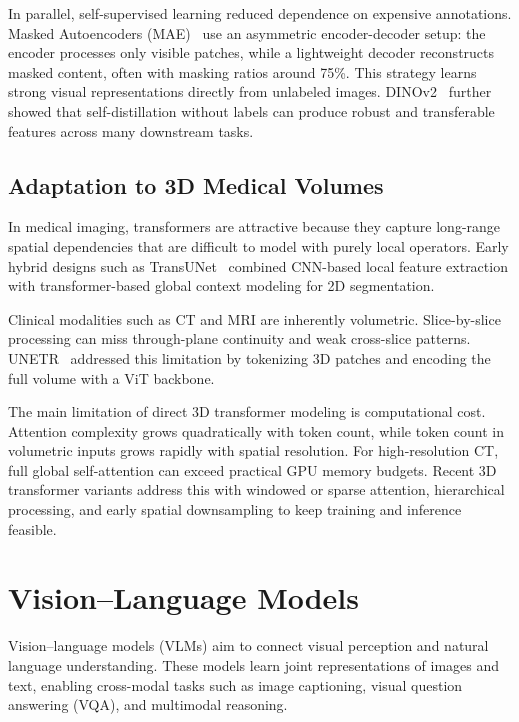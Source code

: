 In parallel, self-supervised learning reduced dependence on expensive annotations. Masked Autoencoders (\ac{MAE})~\cite{he2022masked} use an asymmetric encoder-decoder setup: the encoder processes only visible patches, while a lightweight decoder reconstructs masked content, often with masking ratios around 75\%. This strategy learns strong visual representations directly from unlabeled images. DINOv2~\cite{oquab2023dinov2} further showed that self-distillation without labels can produce robust and transferable features across many downstream tasks.

\subsection{Adaptation to 3D Medical Volumes}

In medical imaging, transformers are attractive because they capture long-range spatial dependencies that are difficult to model with purely local operators. Early hybrid designs such as TransUNet~\cite{chen2021transunet} combined CNN-based local feature extraction with transformer-based global context modeling for 2D segmentation.

Clinical modalities such as CT and MRI are inherently volumetric. Slice-by-slice processing can miss through-plane continuity and weak cross-slice patterns. \ac{UNETR}~\cite{hatamizadeh2022unetr} addressed this limitation by tokenizing 3D patches and encoding the full volume with a ViT backbone.

The main limitation of direct 3D transformer modeling is computational cost. Attention complexity grows quadratically with token count, while token count in volumetric inputs grows rapidly with spatial resolution. For high-resolution CT, full global self-attention can exceed practical \ac{GPU} memory budgets. Recent 3D transformer variants address this with windowed or sparse attention, hierarchical processing, and early spatial downsampling to keep training and inference feasible.

\section{Vision--Language Models}\label{sec:rw_vlm}

Vision--language models (VLMs) aim to connect visual perception and natural language understanding. These models learn joint representations of images and text, enabling cross-modal tasks such as image captioning, visual question answering (\ac{VQA}), and multimodal reasoning.

